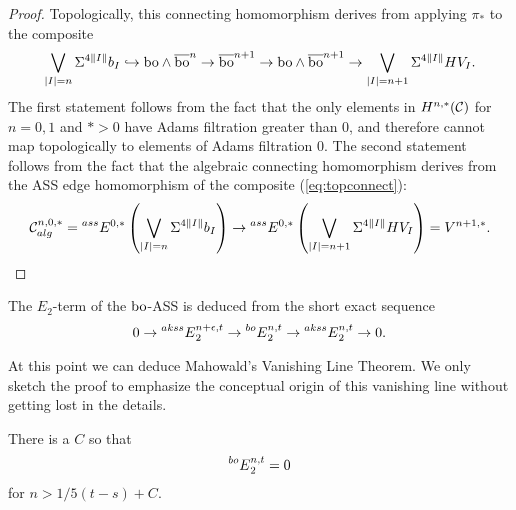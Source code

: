 \begin{proof}
Topologically, this connecting homomorphism derives from applying $\pi_*$ to the composite
\begin{equation}\label{eq:topconnect}
\bigvee_{\lvert I \rvert = n} \Sigma^{4\lVert I \rVert}b_I \hookrightarrow \mathrm{bo} \wedge \overline{\mathrm{bo}}^n \rightarrow \overline{\mathrm{bo}}^{n+1} \rightarrow \mathrm{bo} \wedge \overline{\mathrm{bo}}^{n+1} \rightarrow \bigvee_{\lvert I \rvert = n+1} \Sigma^{4\lVert I \rVert} HV_I.
\end{equation}
The first statement follows from the fact that the only elements in $H^{n,*}(\mathcal{C})$ for $n = 0, 1$ and $* > 0$ have Adams filtration greater than $0$, and therefore cannot map topologically to elements of Adams filtration $0$.
The second statement follows from the fact that the algebraic connecting homomorphism derives from the ASS edge homomorphism of the composite (\ref{eq:topconnect}):
$$
\mathcal{C}_{alg}^{n,0,*} = \prescript{ass}{}{E}^{0,*}\left(\bigvee_{\lvert I \rvert = n} \Sigma^{4\lVert I \rVert}b_I\right) \rightarrow \prescript{ass}{}{E}^{0,*}\left(\bigvee_{\lvert I \rvert = n+1} \Sigma^{4\lVert I \rVert}HV_I\right) = V^{n+1,*}.
$$
\end{proof}

The $E_2$-term of the $\mathrm{bo}$-ASS is deduced from the short exact sequence
$$ 0 \rightarrow \prescript{akss}{}{E}^{n+\epsilon,t}_2 \rightarrow \prescript{bo}{}{E}^{n,t}_2 \rightarrow \prescript{akss}{}{E}^{n,t}_2 \rightarrow 0.
$$

At this point we can deduce Mahowald's Vanishing Line Theorem.  We only sketch the proof to emphasize the conceptual origin of this vanishing line without getting lost in the details.

\begin{thm}\label{thm:vanishing}
There is a $C$ so that 
$$ \prescript{bo}{}{E}_2^{n,t} = 0 $$
for $n > 1/5(t-s)+C$. 
\end{thm}

